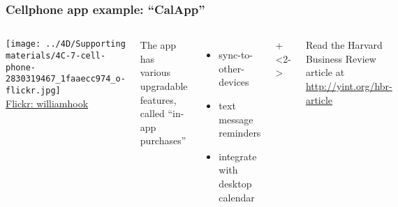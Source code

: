 \begin{frame}\frametitle{Cellphone app example: ``CalApp''}	
	\begin{columns}[T]
			\texttt{[image: ../4D/Supporting materials/4C-7-cell-phone-2830319467\_1faaecc974\_o-flickr.jpg]}
			\\
			\tiny{\href{https://secure.flickr.com/photos/williamhook/2830319467/}{Flickr: williamhook}}
			
		
			The app has various upgradable features, called ``in-app purchases''
			
			\begin{itemize}
				\item	sync-to-other-devices
				\item	text message reminders
				\item	integrate with desktop calendar
			\end{itemize}
			
			\vspace{1cm}
			
			
		\onslide+<2->{	
		}
		
		\vspace{0.5cm}
		{\scriptsize Read the Harvard Business Review article at \href{http://yint.org/hbr-article}{http://yint.org/hbr-article}}
		 
	\end{columns}	
\end{frame}

